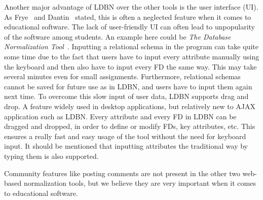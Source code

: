 Another major advantage of LDBN over the other tools is the user interface (UI). 
As Frye~\cite{p12} and Dantin~\cite{p9} stated, this is often a
neglected feature when it comes to educational software. The lack of user-friendly UI 
can often lead to unpopularity of the software among students. An example here could be 
\textit{The Database Normalization Tool}~\cite{w1}. Inputting a relational schema in the program can
take quite some time due to the fact that
users have to input every attribute manually using the keyboard and then also 
have to input every FD the same way. This may take several minutes even for small  
assignments. Furthermore, relational schemas cannot be saved for future use as 
in LDBN, and users have to input them again next time. To overcome this slow input of user data, 
LDBN supports drag and drop. A feature widely used in desktop
applications, but relatively new to AJAX application such as LDBN. Every attribute
and every FD in LDBN can be dragged and dropped, in order 
to define or modify FDs, key attributes, etc. This ensures a really fast and easy
usage of the tool without the need for keyboard input. It should be mentioned
that inputting attributes the traditional way by typing them is also supported.

Community features like posting comments are not present in the other two web-based 
normalization tools, but we believe they are very important when it comes to educational
software. 

